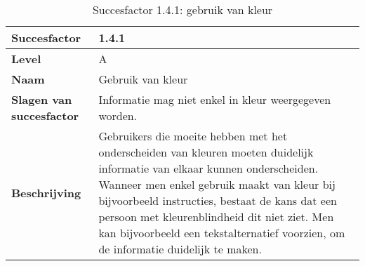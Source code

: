 \begin{table}[H]
    \centering
    \caption{Succesfactor 1.4.1: gebruik van kleur}
    \hspace*{-1cm}\begin{tabular}{|l|p{12cm}|} 
        \hline
        \textbf{Succesfactor}                 & 1.4.1                                                                                                                                                                                                                                                                                                                                                                                                                                                                                                            \\ 
        \hline
        \textbf{Level}                        & A                                                                                                                                                                                                                                                                                                                                                                                                                                                                                                                 \\ 
        \hline
        \textbf{Naam}                         & Gebruik van kleur~                                                                                                                                                                                                                                                                                                                                                                                                                                                                                      \\ 
        \hline
        \textbf{Slagen van succesfactor}      & Informatie mag niet enkel in kleur weergegeven worden.                                                                                                                                                                                                                                                                     \\ 
        \hline
        \textbf{Beschrijving}                 & Gebruikers die moeite hebben met het onderscheiden van kleuren moeten duidelijk informatie van elkaar kunnen onderscheiden. Wanneer men enkel gebruik maakt van kleur bij bijvoorbeeld instructies, bestaat de kans dat een persoon met kleurenblindheid dit niet ziet. Men kan bijvoorbeeld een tekstalternatief voorzien, om de informatie duidelijk te maken. \\ 

\end{tabular}
\end{table}
